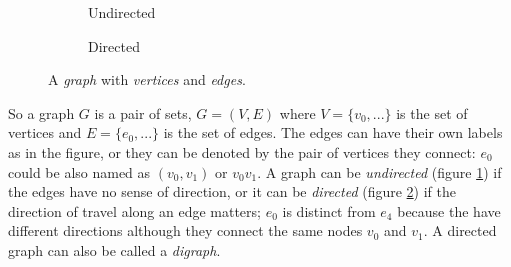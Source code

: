 \documentclass[../main.tex]{subfiles}
\begin{document}
\begin{figure}[h]
    \centering
    \begin{subfigure}[Undirected]{0.4\linewidth}
        \centering
        \caption{Undirected}
        \label{fig:edge_vertex_graph_a}
    \end{subfigure}
    \hspace{5mm}
    \begin{subfigure}[Directed]{0.4\linewidth}
        \centering
        \caption{Directed}
        \label{fig:edge_vertex_graph_b}
    \end{subfigure}
    \caption{A \textit{graph} with \textit{vertices} and \textit{edges}.}
    \label{fig:edge_vertex_graph}
\end{figure}

So a graph $G$ is a pair of sets, $G = (V,E)$ where $V=\{v_0, ...\}$ is the set of vertices and $E=\{e_0, ...\}$ is the set of edges. The edges can have their own labels as in the figure, or they can be denoted by the pair of vertices they connect: $e_0$ could be also named as $(v_0,v_1)$ or $v_0v_1$. A graph can be \emph{undirected} (figure \ref{fig:edge_vertex_graph_a}) if the edges have no sense of direction, or it can be \emph{directed} (figure \ref{fig:edge_vertex_graph_b}) if the direction of travel along an edge matters; $e_0$ is distinct from $e_4$ because the have different directions although they connect the same nodes $v_0$ and $v_1$. A directed graph can also be called a \emph{digraph}.
\end{document}
